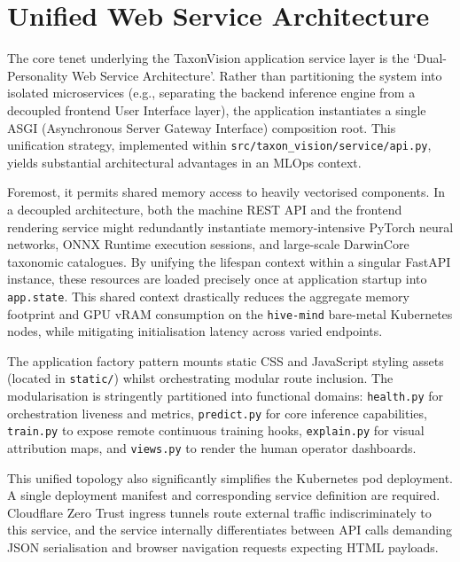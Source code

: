 \section{Unified Web Service Architecture}
\label{sec:unified_web_service_architecture}

The core tenet underlying the TaxonVision application service layer is the `Dual-Personality Web Service Architecture'. Rather than partitioning the system into isolated microservices (e.g., separating the backend inference engine from a decoupled frontend User Interface layer), the application instantiates a single ASGI (Asynchronous Server Gateway Interface) composition root. This unification strategy, implemented within \texttt{src/taxon\_vision/service/api.py}, yields substantial architectural advantages in an MLOps context.

Foremost, it permits shared memory access to heavily vectorised components. In a decoupled architecture, both the machine REST API and the frontend rendering service might redundantly instantiate memory-intensive PyTorch neural networks, ONNX Runtime execution sessions, and large-scale DarwinCore taxonomic catalogues. By unifying the lifespan context within a singular FastAPI instance, these resources are loaded precisely once at application startup into \texttt{app.state}. This shared context drastically reduces the aggregate memory footprint and GPU vRAM consumption on the \texttt{hive-mind} bare-metal Kubernetes nodes, while mitigating initialisation latency across varied endpoints.

The application factory pattern mounts static CSS and JavaScript styling assets (located in \texttt{static/}) whilst orchestrating modular route inclusion. The modularisation is stringently partitioned into functional domains: \texttt{health.py} for orchestration liveness and metrics, \texttt{predict.py} for core inference capabilities, \texttt{train.py} to expose remote continuous training hooks, \texttt{explain.py} for visual attribution maps, and \texttt{views.py} to render the human operator dashboards.

This unified topology also significantly simplifies the Kubernetes pod deployment. A single deployment manifest and corresponding service definition are required. Cloudflare Zero Trust ingress tunnels route external traffic indiscriminately to this service, and the service internally differentiates between API calls demanding JSON serialisation and browser navigation requests expecting HTML payloads.


